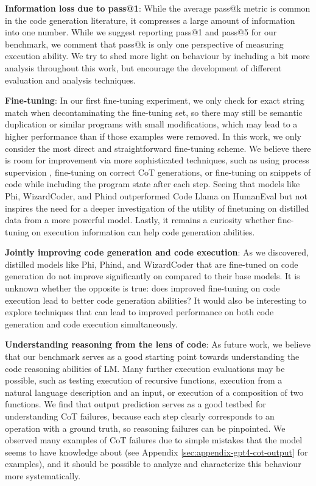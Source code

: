 \textbf{Information loss due to pass@1}: While the average pass@k metric is common in the code generation literature, it compresses a large amount of information into one number. While we suggest reporting pass@1 and pass@5 for our benchmark, we comment that pass@k is only one perspective of measuring execution ability. We try to shed more light on behaviour by including a bit more analysis throughout this work, but encourage the development of different evaluation and analysis techniques.

\textbf{Fine-tuning}: In our first fine-tuning experiment, we only check for exact string match when decontaminating the fine-tuning set, so there may still be semantic duplication or similar programs with small modifications, which may lead to a higher performance than if those examples were removed. In this work, we only consider the most direct and straightforward fine-tuning scheme. We believe there is room for improvement via more sophisticated techniques, such as using process supervision \citep{uesato2022solving}, fine-tuning on correct CoT generations, or fine-tuning on snippets of code while including the program state after each step. Seeing that models like Phi, WizardCoder, and Phind outperformed Code Llama on HumanEval but not \benchmark inspires the need for a deeper investigation of the utility of finetuning on distilled data from a more powerful model. Lastly, it remains a curiosity whether fine-tuning on execution information can help code generation abilities.

\textbf{Jointly improving code generation and code execution}: As we discovered, distilled models like Phi, Phind, and WizardCoder that are fine-tuned on code generation do not improve significantly on \benchmark compared to their base models. It is unknown whether the opposite is true: does improved fine-tuning on code execution lead to better code generation abilities? It would also be interesting to explore techniques that can lead to improved performance on both code generation and code execution simultaneously.

\textbf{Understanding reasoning from the lens of code}: As future work, we believe that our benchmark serves as a good starting point towards understanding the code reasoning abilities of LM. Many further execution evaluations may be possible, such as testing execution of recursive functions, execution from a natural language description and an input, or execution of a composition of two functions. We find that output prediction serves as a good testbed for understanding CoT failures, because each step clearly corresponds to an operation with a ground truth, so reasoning failures can be pinpointed. We observed many examples of CoT failures due to simple mistakes that the model seems to have knowledge about (see Appendix \ref{sec:appendix-gpt4-cot-output} for examples), and it should be possible to analyze and characterize this behaviour more systematically. 

